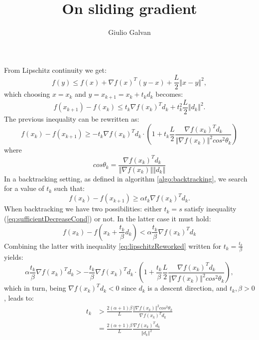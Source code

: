 \documentclass{article}
\title{On sliding gradient}
\author{Giulio Galvan}
\newcommand{\norm}[1]{\left\Vert #1 \right\Vert}
\begin{document}
	\maketitle

\noindent	
From Lipschitz continuity we get:
\begin{equation}
	f(y) \leq f(x) + \nabla f(x)^T(y-x) + \frac{L}{2}\norm{x-y}^2,
\end{equation}
which choosing $x=x_k$ and $y=x_{k+1}=x_k + t_k d_k$ becomes:
\begin{equation}
	f(x_{k+1})-f(x_k) \leq t_k\nabla f(x_k)^Td_k+ t_k^2\frac{L}{2}\norm{d_k}^2.
\end{equation}
The previous inequality can be rewritten as:
\begin{equation}
f(x_k)- f(x_{k+1}) \geq - t_k\nabla f(x_k)^Td_k\cdot \left(1+t_k\frac{L}{2}\frac{\nabla f(x_k)^Td_k}{\norm{\nabla f(x_k)}^2 cos^2\theta_k}\right)
\label{eq:lipschitzReworked}
\end{equation}
where
\begin{equation}
cos\theta_k=\frac{\nabla f(x_k)^Td_k}{\norm{\nabla f(x_k)}\norm{d_k}}
\end{equation}
In a backtracking setting, as defined in algorithm \ref{algo:backtracking}, we search for a value of $t_k$ such that:
\begin{equation}
	f(x_k) - f(x_{k+1})\geq \alpha t_k \nabla f(x_k)^Td_k.
	\label{eq:sufficientDecreaseCond}
\end{equation}
When backtracking we have two possibilities: either $t_k=s$ satisfy inequality (\ref{eq:sufficientDecreaseCond}) or not. In the latter case it must hold:
\begin{equation}
		f(x_k)-f(x_{k}+\frac{t_k}{\beta}d_k) < \alpha \frac{t_k}{\beta} \nabla f(x_k)^Td_k
\label{eq:sufficientDecreaseViolated}
\end{equation}
Combining the latter with inequality \ref{eq:lipschitzReworked} written for $t_k=\frac{t_k}{\beta}$ yields:
\begin{equation}
\alpha \frac{t_k}{\beta} \nabla f(x_k)^Td_k > - \frac{t_k}{\beta}\nabla f(x_k)^Td_k\cdot \left(1+\frac{t_k}{\beta}\frac{L}{2}\frac{\nabla f(x_k)^Td_k}{\norm{\nabla f(x_k)}^2 cos^2\theta_k}\right),
\end{equation}
which in turn, being $\nabla f(x_k)^Td_k<0$ since $d_k$ is a descent direction, and $t_k,\beta>0$, leads to:
\begin{align}
	t_k &> \frac{2(\alpha+1)\beta}{L} \frac{\norm{\nabla f(x_k)}^2 cos^2\theta_k}{\nabla f(x_k)^Td_k} 	\label{eq:lowerBound}\\
	&=\frac{2(\alpha+1)\beta}{L}\frac{\nabla f(x_k)^Td_k}{\norm{d_k}^2}
\end{align}
\end{document}
